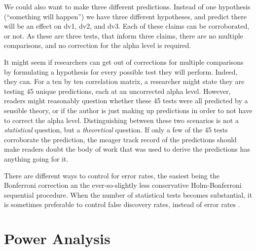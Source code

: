 \documentclass[
  oneside]{krantz}
\begin{document}
We could also want to make three different predictions. Instead of one hypothesis (``something will happen'') we have three different hypotheses, and predict there will be an effect on dv1, dv2, and dv3. Each of these claims can be corroborated, or not. As these are three tests, that inform three claims, there are no multiple comparisons, and no correction for the alpha level is required.

It might seem if researchers can get out of corrections for multiple comparisons by formulating a hypothesis for every possible test they will perform. Indeed, they can. For a ten by ten correlation matrix, a researcher might state they are testing 45 unique predictions, each at an uncorrected alpha level. However, readers might reasonably question whether these 45 tests were all predicted by a sensible theory, or if the author is just making up predictions in order to not have to correct the alpha level. Distinguishing between these two scenarios is not a \emph{statistical} question, but a \emph{theoretical} question. If only a few of the 45 tests corroborate the prediction, the meager track record of the predictions should make readers doubt the body of work that was used to derive the predictions has anything going for it.

There are different ways to control for error rates, the easiest being the Bonferroni correction an the ever-so-slightly less conservative Holm-Bonferroni sequential procedure. When the number of statistical tests becomes substantial, it is sometimes preferable to control false discovery rates, instead of error rates \citep{benjamini_controlling_1995}.

\hypertarget{power-analysis}{%
\section{Power Analysis}\label{power-analysis}}
\end{document}
